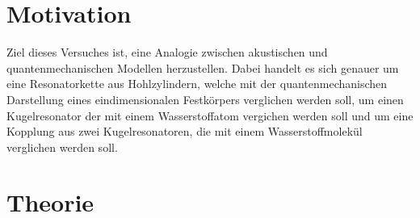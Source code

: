 \section{Motivation}
\label{sec:Motivation}
Ziel dieses Versuches ist, eine Analogie zwischen akustischen und quantenmechanischen 
Modellen herzustellen. Dabei handelt es sich genauer um eine Resonatorkette aus 
Hohlzylindern, 
welche mit der quantenmechanischen Darstellung eines eindimensionalen Festkörpers 
verglichen werden soll, um einen Kugelresonator der mit einem Wasserstoffatom 
vergichen werden soll und um eine 
Kopplung aus zwei Kugelresonatoren, die mit einem Wasserstoffmolekül verglichen werden 
soll.

\section{Theorie}
\label{sec:Theorie}

